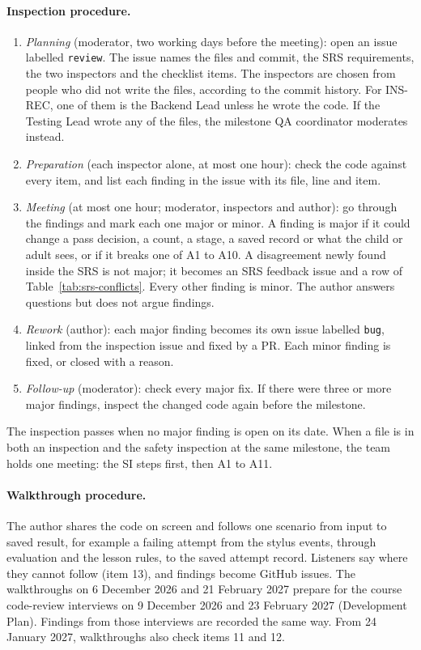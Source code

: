 \documentclass[12pt, titlepage]{article}
\begin{document}
\paragraph{Inspection procedure.}
\begin{enumerate}
\item \emph{Planning} (moderator, two working days before the meeting): open
an issue labelled \texttt{review}. The issue names the files and commit,
the SRS requirements, the two inspectors and the checklist items. The
inspectors are chosen from people who did not write the files, according
to the commit history. For INS-REC, one of them is the Backend Lead unless
he wrote the code. If the Testing Lead wrote any of the files, the
milestone QA coordinator moderates instead.
\item \emph{Preparation} (each inspector alone, at most one hour): check the
code against every item, and list each finding in the issue with its file,
line and item.
\item \emph{Meeting} (at most one hour; moderator, inspectors and author):
go through the findings and mark each one major or minor. A finding is
major if it could change a pass decision, a count, a stage, a saved record
or what the child or adult sees, or if it breaks one of A1 to A10. A
disagreement newly found inside the SRS is not major; it becomes an SRS
feedback issue and a row of Table~\ref{tab:srs-conflicts}. Every other
finding is minor. The author answers questions
but does not argue findings.
\item \emph{Rework} (author): each major finding becomes its own issue
labelled \texttt{bug}, linked from the inspection issue and fixed by a PR.
Each minor finding is fixed, or closed with a reason.
\item \emph{Follow-up} (moderator): check every major fix. If there were
three or more major findings, inspect the changed code again before the
milestone.
\end{enumerate}
The inspection passes when no major finding is open on its date. When a
file is in both an inspection and the safety inspection at the same
milestone, the team holds one meeting: the SI steps first, then A1 to A11.

\paragraph{Walkthrough procedure.} The author shares the code on screen and
follows one scenario from input to saved result, for example a failing
attempt from the stylus events, through evaluation and the lesson rules,
to the saved attempt record. Listeners say where they cannot follow (item
13), and findings become GitHub issues. The walkthroughs on 6 December 2026
and 21 February 2027 prepare for the course code-review interviews on 9
December 2026 and 23 February 2027 (Development Plan). Findings from those
interviews are recorded the same way. From 24 January 2027, walkthroughs
also check items 11 and 12.
\end{document}
